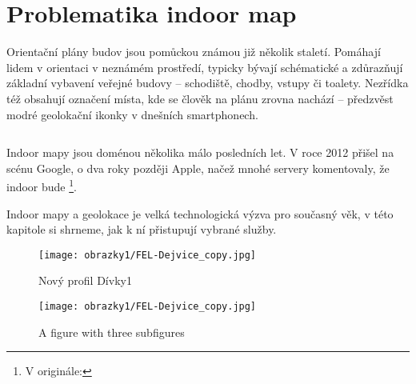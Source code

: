 \chapter{Problematika indoor map}
Orientační plány budov jsou pomůckou známou již několik staletí. Pomáhají lidem v orientaci v neznámém prostředí, typicky bývají schématické a zdůrazňují základní vybavení veřejné budovy – schodiště, chodby, vstupy či toalety. Nezřídka též obsahují označení místa, kde se člověk na plánu zrovna nachází – předzvěst modré geolokační ikonky v dnešních smartphonech.

\begin{lstlisting}[language=javascript]
\end{lstlisting}




\cite{rozvodidnes}

Indoor mapy jsou doménou několika málo posledních let. V roce 2012 přišel na scénu Google, o dva roky později Apple, načež mnohé servery komentovaly, že indoor bude  \footnote{V originále: }.

Indoor mapy a geolokace je velká technologická výzva pro současný věk, v této kapitole si shrneme, jak k ní přistupují vybrané služby. 

 \begin{figure}
	  \centering
      \texttt{[image: obrazky1/FEL-Dejvice\_copy.jpg]}
      \caption{Nový profil Dívky1}
      \label{divka1-profil}
  \end{figure}

  \begin{figure}
\hfill
{}\hfill
\subfloat
  {\texttt{[image: obrazky1/FEL-Dejvice\_copy.jpg]}}
\caption{A figure with three subfigures}
\end{figure}

